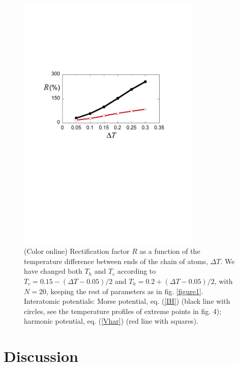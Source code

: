 \begin{figure}
\centering
\includegraphics[width=8.8cm]{Figures/FIG5new.pdf}
\caption{(Color online) Rectification factor $R$ as a function of the temperature difference between ends of the chain of atoms, $\Delta T$.
We have changed both $T_h$ and $T_c$ according to $T_c=0.15-(\Delta T-0.05)/2$ and $T_h=0.2+(\Delta T-0.05)/2$, with $N=20$,  keeping the rest of parameters as in fig. \ref{figure1}.
Interatomic potentials: Morse potential, eq. (\ref{IH}) (black line with circles, see the temperature profiles of extreme points in fig. 4); harmonic potential, eq. (\ref{Vhar}) (red line with squares).}
\label{figure5}
\end{figure}


\section{Discussion}

